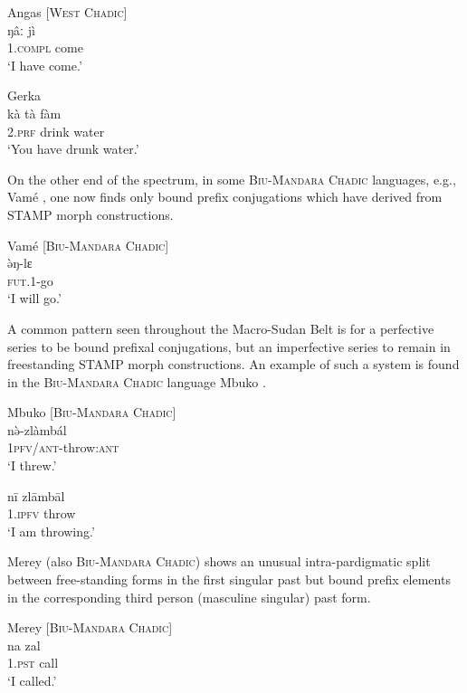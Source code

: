 \documentclass[output=paper]{langsci/langscibook}
\begin{document}
\ea\label{ex:anderson:41}
Angas  \citep[38]{Burquest1973}         [\textsc{West Chadic]}\\
\gll ŋâː    jì\\
1.\textsc{compl}  come\\
\glt  `I have come.'
\z

\ea\label{ex:anderson:42}
Gerka  \citep[173]{Jungraithmayr1968}\\
\gll kà  tà  ƒàm\\
\textsc{2.prf}  drink  water\\
\glt `You have drunk water.'
\z

On the other end of the spectrum, in some \textsc{Biu-Mandara Chadic} languages, e.g., Vamé , one now finds only bound prefix conjugations which have derived from STAMP morph constructions. 

\ea\label{ex:anderson:43}
Vamé  \citep[11]{Kinnaird2006}          [\textsc{Biu-Mandara Chadic}]\\
\gll \`{ə}ŋ-lɛ\\
\textsc{fut}.1-go\\
\glt `I will go.'
\z

A common pattern seen throughout the Macro-Sudan Belt is for a perfective series to be bound prefixal conjugations, but an imperfective series to remain in freestanding STAMP morph constructions. An example of such a system is found in the \textsc{Biu-Mandara Chadic} language Mbuko .

\ea\label{ex:anderson:44}
Mbuko  \citep[7]{Gravina2001}           [\textsc{Biu-Mandara Chadic}]\\
\ea\label{ex:anderson:44a}
\gll n\`{ə}-zlàmbál    \\
  1\textsc{pfv/ant}-throw:\textsc{ant} \\
\glt `I threw.'    

\ex \label{ex:anderson:44b}
\gll n\={i}  zl\={a}mb\={a}l\\
\textsc{1.ipfv}  throw\\
\glt `I am throwing.'  
\z
\z

Merey (also \textsc{Biu-Mandara Chadic}) shows an unusual intra-pardigmatic split between free-standing forms in the first singular past but bound prefix elements in the corresponding third  person  (masculine singular) past form. 

\ea\label{ex:anderson:45}
Merey  \citep[8]{Gravina2007}          [\textsc{Biu-Mandara Chadic}]\\
\ea\label{ex:anderson:45a}
\gll na    zal      \\
  \textsc{1.pst}    call\\
\glt `I called.'
\end{document}
